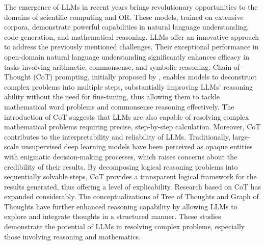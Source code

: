 \documentclass[preprint,12pt]{elsarticle}
\begin{document}
The emergence of LLMs in recent years brings revolutionary opportunities to the domains of scientific computing and OR. These models, trained on extensive corpora, demonstrate powerful capabilities in natural language understanding, code generation, and mathematical reasoning. LLMs offer an innovative approach to address the previously mentioned challenges. Their exceptional performance in open-domain natural language understanding significantly enhances efficacy in tasks involving arithmetic, commonsense, and symbolic reasoning. Chain-of-Thought (CoT) prompting, initially proposed by \citet{weiChainofthoughtPromptingElicits2022a}, enables models to deconstruct complex problems into multiple steps, substantially improving LLMs' reasoning ability without the need for fine-tuning, thus allowing them to tackle mathematical word problems and commonsense reasoning effectively. The introduction of CoT suggests that LLMs are also capable of resolving complex mathematical problems requiring precise, step-by-step calculation. Moreover, CoT contributes to the interpretability and reliability of LLMs. Traditionally, large-scale unsupervised deep learning models have been perceived as opaque entities with enigmatic decision-making processes, which raises concerns about the credibility of their results. By decomposing logical reasoning problems into sequentially solvable steps, CoT provides a transparent logical framework for the results generated, thus offering a level of explicability. Research based on CoT has expanded considerably. The conceptualizations of Tree of Thoughts \citet{yaoTreeThoughtsDeliberate2023a} and Graph of Thoughts \citet{bestaGraphThoughtsSolving2024a} have further enhanced reasoning capability by allowing LLMs to explore and integrate thoughts in a structured manner. These studies demonstrate the potential of LLMs in resolving complex problems, especially those involving reasoning and mathematics.
\end{document}
